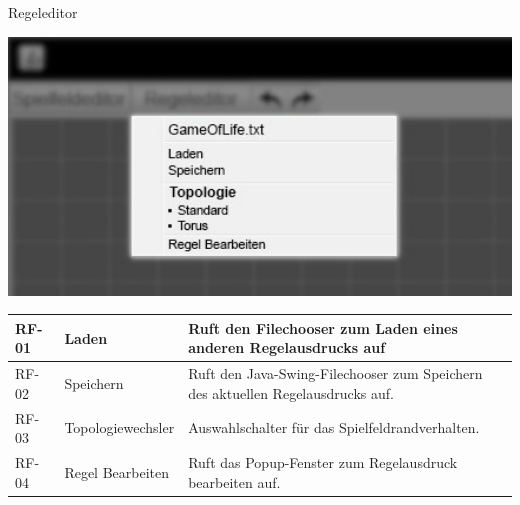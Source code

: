 \documentclass[11pt,a4paper]{article}
\begin{document}
\pagebreak

    Regeleditor %

\par
\includegraphics[width=15cm]{regeleditor_dropdown_edit} %

\begin{longtable}[m]{|m{2cm}|m{4cm}|m{9cm}|} %
		\hline
		RF-01 & Laden & Ruft den Filechooser zum Laden eines anderen Regelausdrucks auf \\
		\hline
		RF-02 & Speichern & Ruft den Java-Swing-Filechooser zum Speichern des aktuellen Regelausdrucks auf. \\
		\hline
		RF-03 & Topologiewechsler & Auswahlschalter für das Spielfeldrandverhalten. \\
		\hline
		RF-04 & Regel Bearbeiten & Ruft das Popup-Fenster zum Regelausdruck bearbeiten auf. \\
		\hline
\end{longtable}
\pagebreak

\end{document}
